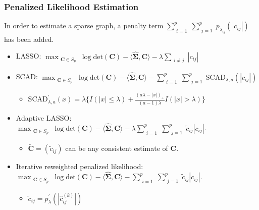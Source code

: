 \documentclass{beamer}
\newcommand{\boldSigma}{{\boldsymbol{\Sigma}}}
\begin{document}
\begin{frame}
\frametitle{Penalized Likelihood Estimation}

In order to estimate a sparse graph, a penalty term $\sum_{\substack{i = 1}}^p \sum_{\substack{j = 1}}^p p_{\lambda_{ij}} (|c_{ij}|)$ has been added. 
\begin{itemize}
\item LASSO:  $\max_{\substack{\mathbf{C} \in S_p}} \log \text{det} (\mathbf{C}) -  \langle \hat{\boldSigma}, \mathbf{C} \rangle  - \lambda \sum_{\substack{i \neq j}}  |c_{ij}|$
   
\item SCAD: $\max_{\substack{\mathbf{C} \in S_p}} \log \text{det} (\mathbf{C}) -  \langle \hat{\boldSigma}, \mathbf{C} \rangle  - \sum_{\substack{i = 1}}^p \sum_{\substack{j = 1}}^p \text{SCAD}_{\lambda, a}(|c_{ij}|)$
    \begin{itemize}
    \item $\text{SCAD}_{\lambda, a}^{'}(x) = \lambda \Big\{ I(|x| \leq \lambda) + \frac{(a \lambda - |x|)_{+}}{(a - 1)\lambda} I(|x| > \lambda) \Big\}$
    \end{itemize}     
\item Adaptive LASSO: $\max_{\substack{\mathbf{C} \in S_p}} \log \text{det} (\mathbf{C}) -  \langle \hat{\boldSigma}, \mathbf{C} \rangle - \lambda \sum_{\substack{i = 1}}^p \sum_{\substack{j = 1}}^p \tilde{c}_{ij} |c_{ij}| $.  
    \begin{itemize}
    \item $\tilde{\mathbf{C}} = (\tilde{c}_{ij})$ can be any consistent estimate of $\mathbf{C}$. 
    \end{itemize}  
\item Iterative reweighted penalized likelihood: $\max_{\substack{\mathbf{C} \in S_p}} \log \text{det} (\mathbf{C}) -  \langle \hat{\boldSigma}, \mathbf{C} \rangle - \sum_{\substack{i = 1}}^p \sum_{\substack{j = 1}}^p \tilde{c}_{ij} |c_{ij}| $.   
    \begin{itemize}
    \item $\tilde{c}_{ij} = p_{\lambda}^{'}(|\hat{c}_{ij}^{(k)}|)$
    \end{itemize} 
\end{itemize}

\end{frame}
\end{document}
